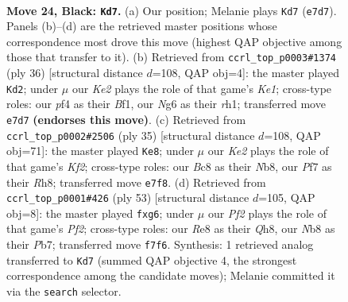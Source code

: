 \documentclass[11pt]{article}
\begin{document}
\clearpage

\begin{figure}[p]\centering
\begin{subfigure}{0.46\textwidth}\centering
\resizebox{\linewidth}{!}{%
\newchessgame
\chessboard[
  setfen={rnb1r3/1p2kp1p/4p1n1/p1P1P1Q1/P4P2/8/2q1B3/R1B1K1NR b KQ - 3 24},
  showmover=false,
  pgfstyle=straightmove, color=movearrow, markmove={e7-d7}
]}
\caption{}
\end{subfigure}\hfill
\begin{subfigure}{0.46\textwidth}\centering
\resizebox{\linewidth}{!}{%
\newchessgame
\chessboard[
  setfen={r3kb2/pp6/1qpp1Q2/4n1p1/4P1b1/PNN1P1R1/1PP5/R3KB1r w Qq - 1 19},
  showmover=false,
  pgfstyle=straightmove, color=movearrow, markmove={e1-d2}
]}
\caption{}
\end{subfigure}
\\[4pt]
\begin{subfigure}{0.46\textwidth}\centering
\resizebox{\linewidth}{!}{%
\newchessgame
\chessboard[
  setfen={rn5r/5kpp/pp6/2b1PQB1/3q4/P1N2P2/1P3n1P/R3K2R b KQ - 7 18},
  showmover=false,
  pgfstyle=straightmove, color=movearrow, markmove={f7-e8}
]}
\caption{}
\end{subfigure}\hfill
\begin{subfigure}{0.46\textwidth}\centering
\resizebox{\linewidth}{!}{%
\newchessgame
\chessboard[
  setfen={r3b1kq/ppr2p2/4p1NB/3n2Qp/3P4/P2B4/1P3PP1/4R1K1 b - - 0 27},
  showmover=false,
  pgfstyle=straightmove, color=movearrow, markmove={f7-g6}
]}
\caption{}
\end{subfigure}
\caption{\textbf{Move 24, Black: \texttt{Kd7}.} (a) Our position; Melanie plays \texttt{Kd7} (\texttt{e7d7}). Panels (b)--(d) are the retrieved master positions whose correspondence most drove this move (highest QAP objective among those that transfer to it). (b) Retrieved from \texttt{ccrl\_top\_p0003\#1374} (ply 36) [structural distance $d$=108, QAP obj=4]: the master played \texttt{Kd2}; under $\mu$ our \emph{Ke2} plays the role of that game's \emph{Ke1}; cross-type roles: our \emph{p}f4 as their \emph{B}f1, our \emph{N}g6 as their \emph{r}h1; transferred move \texttt{e7d7} \textbf{(endorses this move)}. (c) Retrieved from \texttt{ccrl\_top\_p0002\#2506} (ply 35) [structural distance $d$=108, QAP obj=71]: the master played \texttt{Ke8}; under $\mu$ our \emph{Ke2} plays the role of that game's \emph{Kf2}; cross-type roles: our \emph{B}c8 as their \emph{N}b8, our \emph{P}f7 as their \emph{R}h8; transferred move \texttt{e7f8}. (d) Retrieved from \texttt{ccrl\_top\_p0001\#426} (ply 53) [structural distance $d$=105, QAP obj=8]: the master played \texttt{fxg6}; under $\mu$ our \emph{Pf2} plays the role of that game's \emph{Pf2}; cross-type roles: our \emph{R}e8 as their \emph{Q}h8, our \emph{N}b8 as their \emph{P}b7; transferred move \texttt{f7f6}. Synthesis: 1 retrieved analog transferred to \texttt{Kd7} (summed QAP objective 4, the strongest correspondence among the candidate moves); Melanie committed it via the \texttt{search} selector.}
\label{fig:thought-m47}
\end{figure}
\end{document}
